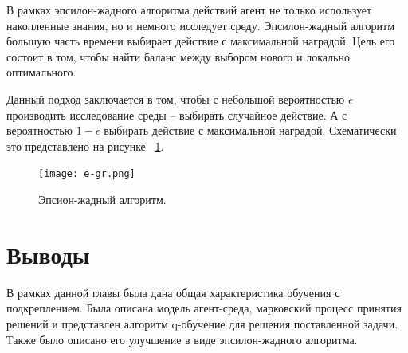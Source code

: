 В рамках эпсилон-жадного алгоритма действий агент не только использует накопленные знания, но и немного исследует среду. Эпсилон-жадный алгоритм большую часть времени выбирает действие с максимальной наградой. Цель его состоит в том, чтобы найти баланс между выбором нового и локально оптимального. 

Данный подход заключается в том, чтобы с небольшой вероятностью $\epsilon$ производить исследование среды  -- выбирать случайное действие. А с вероятностью $1-\epsilon$ выбирать действие с максимальной наградой. Схематически это представлено на рисунке ~\ref{fig:eps}. \newpage


\begin{figure}[h]
	\centering
	\texttt{[image: e-gr.png]}
	\caption {Эпсион-жадный алгоритм.}
	\label{fig:eps}
\end{figure}


\section{Выводы}\label{1sec:optimal-control}


В рамках данной главы была дана общая характеристика обучения с подкреплением. Была описана модель агент-среда, марковский процесс принятия решений и представлен алгоритм q-обучение для решения поставленной задачи. Также было описано его улучшение в виде эпсилон-жадного алгоритма.
